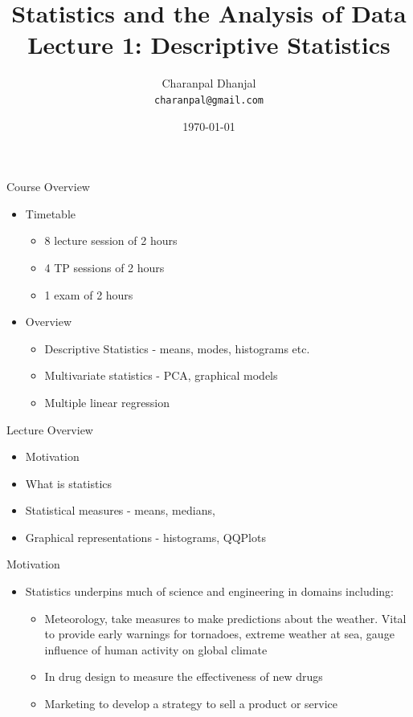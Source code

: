 \documentclass{beamer}
\title{Statistics and the Analysis of Data\\ Lecture 1: Descriptive Statistics}
\author{Charanpal Dhanjal \\ \texttt{charanpal@gmail.com}}
\institute{\'{E}cole des Ponts}
\date{\today}
\begin{document}
\frame{\titlepage}

\begin{frame}{Course Overview}
\begin{itemize}
\item Timetable 
\begin{itemize}
\item 8 lecture session of 2 hours
\item 4 TP sessions of 2 hours
\item 1 exam of 2 hours 
\end{itemize}
\item Overview
\begin{itemize} 
\item Descriptive Statistics - means, modes, histograms etc. 
\item Multivariate statistics - PCA, graphical models 
\item Multiple linear regression 
\end{itemize}
\end{itemize}
\end{frame}

\begin{frame}{Lecture Overview}
\begin{itemize} 
 \item Motivation 
\item What is statistics 
\item Statistical measures - means, medians, 
\item Graphical representations - histograms, QQPlots 
\end{itemize}
\end{frame}

\begin{frame}{Motivation} 
\begin{itemize} 
 \item Statistics underpins much of science and engineering in domains including: 
\begin{itemize} 
\item Meteorology, take measures to make predictions about the weather. Vital to provide early warnings for tornadoes, extreme weather at sea, gauge influence of human activity on global climate 
\item In drug design to measure the effectiveness of new drugs 
\item Marketing to develop a strategy to sell a product or service 
\end{itemize} 
\end{itemize}
\end{frame}
\end{document}
